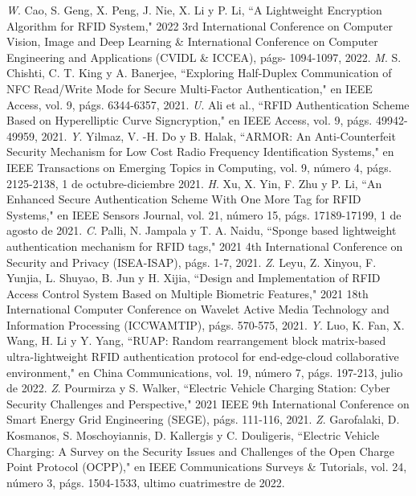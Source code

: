 \documentclass[12pt,a4paper,onecolumn,oneside]{report}
\begin{document}
\begin{thebibliography}{1}


 \textit W. Cao, S. Geng, X. Peng, J. Nie, X. Li y P. Li, ``A Lightweight Encryption Algorithm for RFID System," 2022 3rd International Conference on Computer Vision, Image and Deep Learning \& International Conference on Computer Engineering and Applications (CVIDL \& ICCEA), págs- 1094-1097, 2022.
 \textit M. S. Chishti, C. T. King y A. Banerjee, ``Exploring Half-Duplex Communication of NFC Read/Write Mode for Secure Multi-Factor Authentication," en IEEE Access, vol. 9, págs. 6344-6357, 2021.
 \textit U. Ali et al., ``RFID Authentication Scheme Based on Hyperelliptic Curve Signcryption," en IEEE Access, vol. 9, págs. 49942-49959, 2021.
 \textit Y. Yilmaz, V. -H. Do y B. Halak, ``ARMOR: An Anti-Counterfeit Security Mechanism for Low Cost Radio Frequency Identification Systems," en IEEE Transactions on Emerging Topics in Computing, vol. 9, número 4, págs. 2125-2138, 1 de octubre-diciembre 2021.
 \textit H. Xu, X. Yin, F. Zhu y P. Li, ``An Enhanced Secure Authentication Scheme With One More Tag for RFID Systems," en IEEE Sensors Journal, vol. 21, número 15, págs. 17189-17199, 1 de agosto de 2021.
 \textit C. Palli, N. Jampala y T. A. Naidu, ``Sponge based lightweight authentication mechanism for RFID tags," 2021 4th International Conference on Security and Privacy (ISEA-ISAP), págs. 1-7, 2021.
 \textit Z. Leyu, Z. Xinyou, F. Yunjia, L. Shuyao, B. Jun y  H. Xijia, ``Design and Implementation of RFID Access Control System Based on Multiple Biometric Features," 2021 18th International Computer Conference on Wavelet Active Media Technology and Information Processing (ICCWAMTIP), págs. 570-575, 2021.
 \textit Y. Luo, K. Fan, X. Wang, H. Li y Y. Yang, ``RUAP: Random rearrangement block matrix-based ultra-lightweight RFID authentication protocol for end-edge-cloud collaborative environment," en China Communications, vol. 19, número 7, págs. 197-213, julio de 2022.
 \textit Z. Pourmirza y S. Walker, ``Electric Vehicle Charging Station: Cyber Security Challenges and Perspective," 2021 IEEE 9th International Conference on Smart Energy Grid Engineering (SEGE), págs. 111-116, 2021.
 \textit Z. Garofalaki, D. Kosmanos, S. Moschoyiannis, D. Kallergis y C. Douligeris, ``Electric Vehicle Charging: A Survey on the Security Issues and Challenges of the Open Charge Point Protocol (OCPP)," en IEEE Communications Surveys \& Tutorials, vol. 24, número 3, págs. 1504-1533, ultimo cuatrimestre de 2022.

\end{thebibliography}
\end{document}
